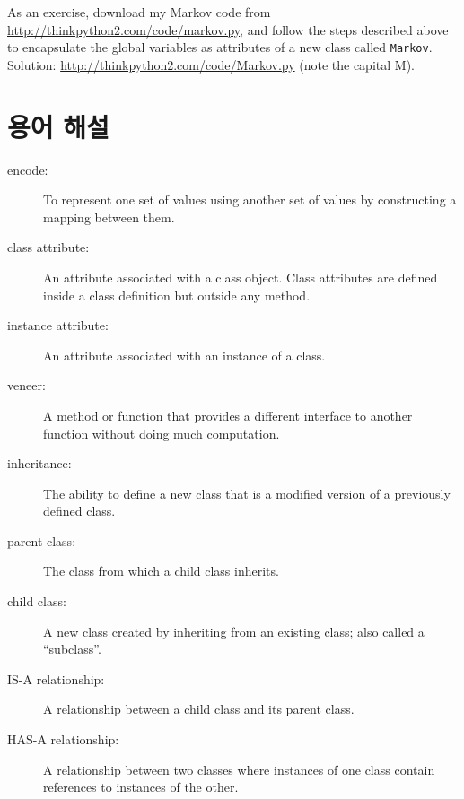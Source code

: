 \documentclass[10pt]{book}
\begin{document}
As an exercise, download my Markov code from
\url{http://thinkpython2.com/code/markov.py}, and follow the steps
described above to encapsulate the global variables as attributes of a
new class called {\tt Markov}.  Solution:
\url{http://thinkpython2.com/code/Markov.py} (note the capital M).


\section{용어 해설}

\begin{description}

\item[encode:]  To represent one set of values using another
set of values by constructing a mapping between them.

\item[class attribute:] An attribute associated with a class
object.  Class attributes are defined inside
a class definition but outside any method.

\item[instance attribute:] An attribute associated with an
instance of a class.

\item[veneer:] A method or function that provides a different
interface to another function without doing much computation.

\item[inheritance:] The ability to define a new class that is a
modified version of a previously defined class.

\item[parent class:] The class from which a child class inherits.

\item[child class:] A new class created by inheriting from an
existing class; also called a ``subclass''.

\item[IS-A relationship:] A relationship between a child class
and its parent class.

\item[HAS-A relationship:] A relationship between two classes
where instances of one class contain references to instances of
the other.


\end{description}
\end{document}
